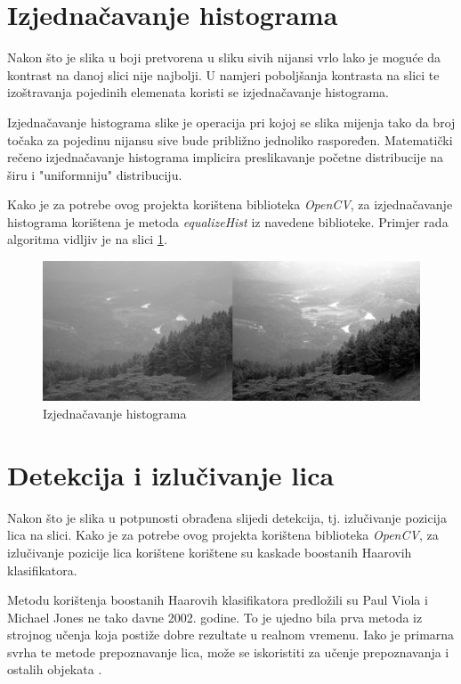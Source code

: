 \documentclass[times, utf8, zavrsni, numeric]{fer}
\begin{document}
\section{Izjednačavanje histograma}

Nakon što je slika u boji pretvorena u sliku sivih nijansi vrlo lako je moguće da kontrast na danoj slici nije najbolji. U namjeri poboljšanja kontrasta na slici te izoštravanja pojedinih elemenata koristi se izjednačavanje histograma.

Izjednačavanje histograma slike je operacija pri kojoj se slika mijenja tako da broj točaka za pojedinu nijansu sive bude približno jednoliko raspoređen. Matematički rečeno izjednačavanje histograma implicira preslikavanje početne distribucije na širu i "uniformniju" distribuciju.

Kako je za potrebe ovog projekta korištena biblioteka \emph{OpenCV}, za izjednačavanje histograma korištena je metoda \emph{equalizeHist} iz navedene biblioteke. Primjer rada algoritma vidljiv je na slici \ref{fig:eq_hist}.

\begin{figure}[htb]
    \centering
    \includegraphics[width=14cm]{images/eq_hist.jpg}
    \caption{Izjednačavanje histograma}
    \label{fig:eq_hist}
\end{figure}

\section{Detekcija i izlučivanje lica}

Nakon što je slika u potpunosti obrađena slijedi detekcija, tj. izlučivanje pozicija lica na slici. Kako je za potrebe ovog projekta korištena biblioteka \emph{OpenCV}, za izlučivanje pozicije lica korištene korištene su kaskade boostanih Haarovih klasifikatora.

Metodu korištenja boostanih Haarovih klasifikatora predložili su Paul Viola i Michael Jones ne tako davne 2002. godine. To je ujedno bila prva metoda iz strojnog učenja koja postiže dobre rezultate u realnom vremenu. Iako je primarna svrha te metode prepoznavanje lica, može se iskoristiti za učenje prepoznavanja i ostalih objekata \citep{culjakRad}.
\end{document}
